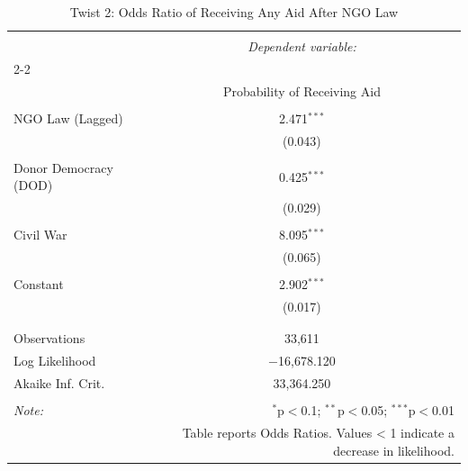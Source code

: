 
\begin{table}[!htbp] \centering 
  \caption{Twist 2: Odds Ratio of Receiving Any Aid After NGO Law} 
  \label{} 
\begin{tabular}{@{\extracolsep{5pt}}lc} 
\\[-1.8ex]\hline 
\hline \\[-1.8ex] 
 & \multicolumn{1}{c}{\textit{Dependent variable:}} \\ 
\cline{2-2} 
\\[-1.8ex] & Probability of Receiving Aid \\ 
\hline \\[-1.8ex] 
 NGO Law (Lagged) & 2.471$^{***}$ \\ 
  & (0.043) \\ 
  & \\ 
 Donor Democracy (DOD) & 0.425$^{***}$ \\ 
  & (0.029) \\ 
  & \\ 
 Civil War & 8.095$^{***}$ \\ 
  & (0.065) \\ 
  & \\ 
 Constant & 2.902$^{***}$ \\ 
  & (0.017) \\ 
  & \\ 
\hline \\[-1.8ex] 
Observations & 33,611 \\ 
Log Likelihood & $-$16,678.120 \\ 
Akaike Inf. Crit. & 33,364.250 \\ 
\hline 
\hline \\[-1.8ex] 
\textit{Note:}  & \multicolumn{1}{r}{$^{*}$p$<$0.1; $^{**}$p$<$0.05; $^{***}$p$<$0.01} \\ 
 & \multicolumn{1}{r}{Table reports Odds Ratios. Values < 1 indicate a decrease in likelihood.} \\ 
\end{tabular} 
\end{table} 
